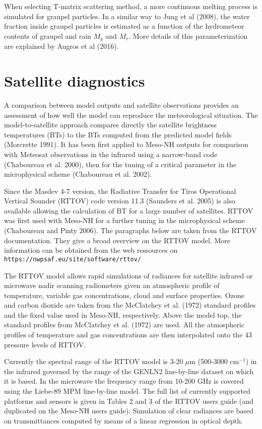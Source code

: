 \begin{description}
When selecting T-matrix scattering method, a more continuous melting process is simulated for graupel particles. 
In a similar way to Jung et al (2008), the water
fraction inside graupel particles is estimated as a function of the hydrometeor contents of graupel and rain $M_g$ and $M_r$.
More details of this parameterization are explained by Augros et al (2016). 
\end{description}

\section{Satellite diagnostics}
A comparison between model outputs and satellite observations provides an assessment of how well the model can reproduce the meteorological situation.
 The model-to-satellite approach compares directly the satellite brightness temperatures (BTs) to the BTs computed from the predicted model fields 
(Morcrette 1991). It has been first applied to Meso-NH outputs for comparison
 with Meteosat observations in the infrared using a narrow-band code 
(Chaboureau et al. 2000), then for the tuning of a critical parameter in the microphysical scheme (Chaboureau et al. 2002).

Since the Masdev 4-7 version, the Radiative Transfer for Tiros Operational Vertical Sounder (RTTOV) code version 11.3 (Saunders et al. 2005) is also available
allowing the calculation of BT for a large number of satellites. RTTOV was first used with Meso-NH for a further tuning in the microphysical scheme (Chaboureau and Pinty 2006). The paragraphs below are taken from the RTTOV documentation. They give a broad overview on the RTTOV model. More information can be obtained from the web ressources on {\tt https://nwpsaf.eu/site/software/rttov/ }

The RTTOV model allows rapid simulations of radiances for satellite infrared or
microwave nadir scanning radiometers given an atmospheric profile of
temperature, variable gas concentrations, cloud and surface properties.
Ozone and carbon dioxide are taken from the McClatchey et al. (1972) standard
profiles and the fixed value used in Meso-NH, respectively. Above the model
top, the standard profiles from McClatchey et al. (1972) are used.
All the atmospheric profiles of temperature and gas concentrations are then
interpolated onto the 43 pressure levels of RTTOV.

Currently the spectral range of the RTTOV model is 3-20 $\mu$m (500-3000
cm$^{-1}$)  in the infrared governed by the range of the GENLN2
line-by-line dataset on which it is based.
In the microwave the frequency range from 10-200 GHz is covered using
the Liebe-89 MPM line-by-line model. The full list of currently
supported platforms and sensors is given in Tables 2 and 3 of
the RTTOV users guide (and duplicated on the Meso-NH users guide).
Simulation of clear radiances are based on transmittances computed by means
of a linear regression in optical depth.

